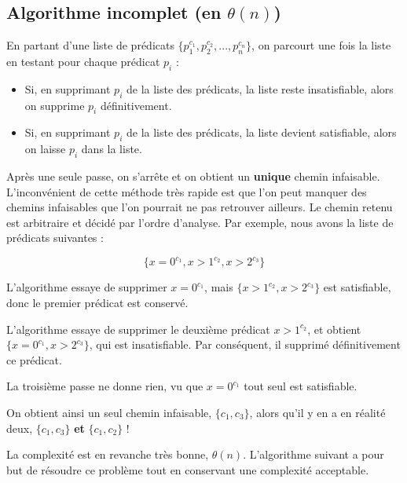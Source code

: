 \documentclass[french]{article}
\begin{document}
  \subsection{Algorithme incomplet (en $\theta(n)$)}
  En partant d'une liste de prédicats $\{p_1^{c_1}, p_2^{c_2}, ..., p_n^{c_n}\}$, on parcourt une fois la liste en testant pour chaque prédicat $p_i$ :

  \begin{itemize}
   \item Si, en supprimant $p_i$ de la liste des prédicats, la liste reste insatisfiable, alors on supprime $p_i$ définitivement.
   \item Si, en supprimant $p_i$ de la liste des prédicats, la liste devient satisfiable, alors on laisse $p_i$ dans la liste.
  \end{itemize}

  Après une seule passe, on s'arrête et on obtient un \textbf{unique} chemin infaisable. L'inconvénient de cette méthode très rapide est que l'on peut manquer des chemins infaisables que l'on pourrait ne pas retrouver ailleurs. Le chemin retenu est arbitraire et décidé par l'ordre d'analyse. Par exemple, nous avons la liste de prédicats suivantes :

  \[\{x = 0^{c_1}, x > 1^{c_2}, x > 2^{c_3}\}\]

  L'algorithme essaye de supprimer $x = 0^{c_1}$, mais $\{x > 1^{c_2}, x > 2^{c_3}\}$ est satisfiable, donc le premier prédicat est conservé.

  L'algorithme essaye de supprimer le deuxième prédicat $x > 1^{c_2}$, et obtient $\{x = 0^{c_1}, x > 2^{c_3}\}$, qui est insatisfiable. Par conséquent, il supprimé définitivement ce prédicat.

  La troisième passe ne donne rien, vu que ${x = 0^{c_1}}$ tout seul est satisfiable.

  On obtient ainsi un seul chemin infaisable, $\{c_1, c_3\}$, alors qu'il y en a en réalité deux, $\{c_1, c_3\}$ \textbf{et} $\{c_1, c_2\}$ !

  La complexité est en revanche très bonne, $\theta(n)$. L'algorithme suivant a pour but de résoudre ce problème tout en conservant une complexité acceptable.
\end{document}
